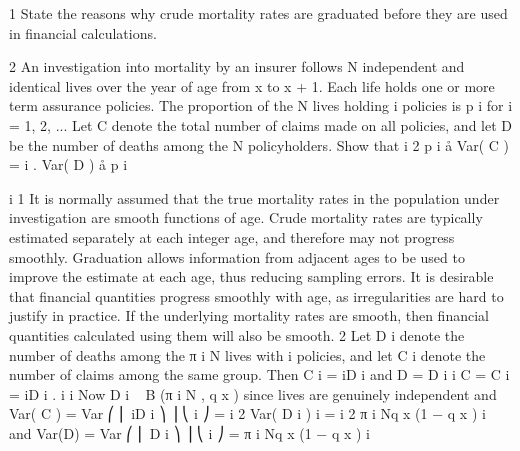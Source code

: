 \documentclass[a4paper,12pt]{article}
\begin{document}
1 State the reasons why crude mortality rates are graduated before they are used in
financial calculations.

2 An investigation into mortality by an insurer follows N independent and identical
lives over the year of age from x to x + 1. Each life holds one or more term assurance
policies. The proportion of the N lives holding i policies is p i for i = 1, 2, ...
Let C denote the total number of claims made on all policies, and let D be the number
of deaths among the N policyholders. Show that
i 2 p i
å
Var( C )
= i
.
Var( D )
å p i

i
1
It is normally assumed that the true mortality rates in the population under
investigation are smooth functions of age.
Crude mortality rates are typically estimated separately at each integer age, and
therefore may not progress smoothly.
Graduation allows information from adjacent ages to be used to improve the estimate
at each age, thus reducing sampling errors.
It is desirable that financial quantities progress smoothly with age, as irregularities are
hard to justify in practice. If the underlying mortality rates are smooth, then financial
quantities calculated using them will also be smooth.
2
Let D i denote the number of deaths among the π i N lives with i policies, and let C i
denote the number of claims among the same group. Then C i = iD i and
D =
\sum  D i
i
C =
\sum  C i = \sum  iD i .
i
i
Now D i ~ B (π i N , q x ) since lives are genuinely independent and
Var( C )
= Var ⎛ ⎜ \sum  iD i ⎞ ⎟
⎝ i
⎠
=
\sum  i 2 Var( D i )
i
=
\sum  i 2 π i Nq x (1 − q x )
i
and
Var(D)
= Var ⎛ ⎜ \sum  D i ⎞ ⎟
⎝ i
⎠
=
\sum  π i Nq x (1 − q x )
i
\end{document}

